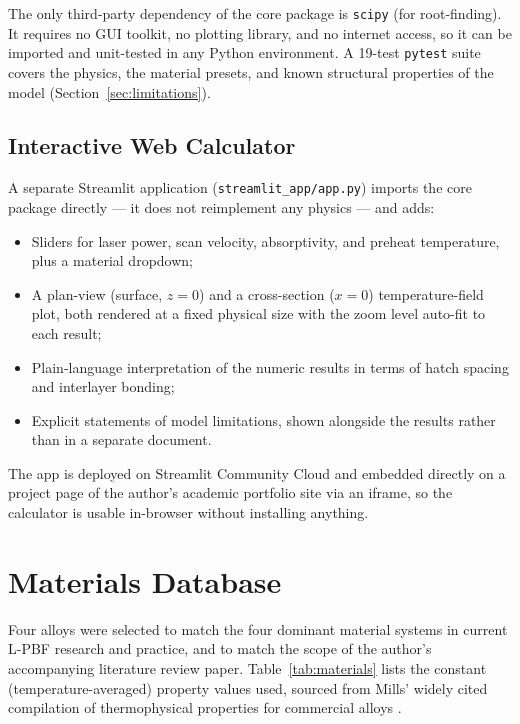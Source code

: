 \documentclass[10pt,journal]{IEEEtran}
\begin{document}
The only third-party dependency of the core package is \texttt{scipy} (for root-finding). It requires no GUI toolkit, no plotting library, and no internet access, so it can be imported and unit-tested in any Python environment. A 19-test \texttt{pytest} suite covers the physics, the material presets, and known structural properties of the model (Section~\ref{sec:limitations}).

\subsection{Interactive Web Calculator}

A separate Streamlit application (\texttt{streamlit\_app/app.py}) imports the core package directly --- it does not reimplement any physics --- and adds:

\begin{itemize}
\item Sliders for laser power, scan velocity, absorptivity, and preheat temperature, plus a material dropdown;
\item A plan-view (surface, $z=0$) and a cross-section ($x=0$) temperature-field plot, both rendered at a fixed physical size with the zoom level auto-fit to each result;
\item Plain-language interpretation of the numeric results in terms of hatch spacing and interlayer bonding;
\item Explicit statements of model limitations, shown alongside the results rather than in a separate document.
\end{itemize}

The app is deployed on Streamlit Community Cloud and embedded directly on a project page of the author's academic portfolio site via an iframe, so the calculator is usable in-browser without installing anything.

\section{Materials Database}
\label{sec:materials}

Four alloys were selected to match the four dominant material systems in current L-PBF research and practice, and to match the scope of the author's accompanying literature review paper. Table~\ref{tab:materials} lists the constant (temperature-averaged) property values used, sourced from Mills' widely cited compilation of thermophysical properties for commercial alloys \cite{mills2002}.
\end{document}
